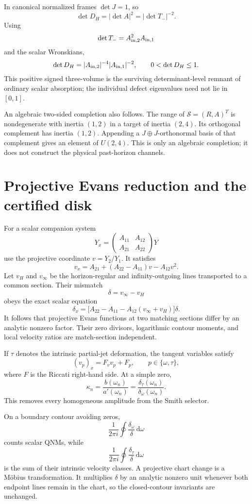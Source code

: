 \documentclass[11pt]{article}
\theoremstyle{definition}
\theoremstyle{remark}
\newcommand{\dd}{\mathrm d}
\begin{document}
In canonical normalized frames \(\det J=1\), so
\[
\det D_H=|\det A|^2=|\det T_-|^{-2}.
\]
Using
\[
\det T_-=A_{{\rm in},2}^2A_{{\rm in},1}
\]
and the scalar Wronskians,
\[
\det D_H=
|A_{{\rm in},2}|^{-4}|A_{{\rm in},1}|^{-2},
\qquad
0<\det D_H\le1.
\]
This positive signed three-volume is the surviving determinant-level remnant
of ordinary scalar absorption; the individual defect eigenvalues need not
lie in \([0,1]\).

An algebraic two-sided completion also follows.  The range of
\(\mathscr S=(R,A)^T\) is nondegenerate with inertia \((1,2)\) in a target of
inertia \((2,4)\).  Its orthogonal complement has inertia \((1,2)\).
Appending a \(J\oplus J\)-orthonormal basis of that complement gives an
element of \(U(2,4)\).  This is only an algebraic completion; it does not
construct the physical past-horizon channels.

\section{Projective Evans reduction and the certified disk}
\label{app:projective-evans}

For a scalar companion system
\[
Y_x=
\begin{pmatrix}A_{11}&A_{12}\\A_{21}&A_{22}\end{pmatrix}Y
\]
use the projective coordinate \(v=Y_2/Y_1\).  It satisfies
\[
v_x=A_{21}+(A_{22}-A_{11})v-A_{12}v^2.
\]
Let \(v_H\) and \(v_\infty\) be the horizon-regular and infinity-outgoing
lines transported to a common section.  Their mismatch
\[
\delta=v_\infty-v_H
\]
obeys the exact scalar equation
\[
\delta_x=
\bigl[A_{22}-A_{11}-A_{12}(v_\infty+v_H)\bigr]\delta.
\]
It follows that projective Evans functions at two matching sections differ
by an analytic nonzero factor.  Their zero divisors, logarithmic contour
moments, and local velocity ratios are match-section independent.

If \(\tau\) denotes the intrinsic partial-jet deformation, the tangent
variables satisfy
\[
(v_p)_x=F_vv_p+F_p,\qquad p\in\{\omega,\tau\},
\]
where \(F\) is the Riccati right-hand side.  At a simple zero,
\[
\kappa_n=
\frac{b(\omega_n)}{a'(\omega_n)}
=\frac{\delta_\tau(\omega_n)}{\delta_\omega(\omega_n)}.
\]
This removes every homogeneous amplitude from the Smith selector.

On a boundary contour avoiding zeros,
\[
\frac1{2\pi i}\oint\frac{\delta_\omega}{\delta}\,\dd\omega
\]
counts scalar QNMs, while
\[
\frac1{2\pi i}\oint\frac{\delta_\tau}{\delta}\,\dd\omega
\]
is the sum of their intrinsic velocity classes.  A projective chart change is
a M\"obius transformation.  It multiplies \(\delta\) by an analytic nonzero
unit whenever both endpoint lines remain in the chart, so the closed-contour
invariants are unchanged.
\end{document}
